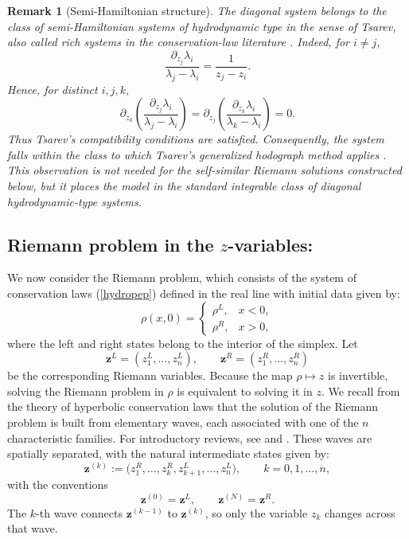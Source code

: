 \documentclass[12pt]{article}
\newtheorem{remark}[theorem]{Remark}
\newcommand{\eref}[1]{(\ref{#1})}
\begin{document}
\begin{remark}[Semi-Hamiltonian structure]
The diagonal system belongs to the class of semi-Hamiltonian systems
of hydrodynamic type in the sense of Tsarev, also called rich systems
in the conservation-law literature \cite{Tsarev,Dubrovin,Serre}. Indeed, for
$i\neq j$,
\[
\frac{\partial_{z_j}\lambda_i}{\lambda_j-\lambda_i}
=
\frac{1}{z_j-z_i}.
\]
Hence, for distinct $i,j,k$,
\[
\partial_{z_k}
\left(
\frac{\partial_{z_j}\lambda_i}{\lambda_j-\lambda_i}
\right)
=
\partial_{z_j}
\left(
\frac{\partial_{z_k}\lambda_i}{\lambda_k-\lambda_i}
\right)
=0.
\]
Thus Tsarev's compatibility conditions are satisfied. Consequently,
the system falls within the class to which Tsarev's generalized
hodograph method applies \cite{Tsarev}. This observation is not needed
for the self-similar Riemann solutions constructed below, but it places
the model in the standard integrable class of diagonal hydrodynamic-type
systems.
\end{remark}

\subsection{Riemann problem in the $z$-variables:}

We now consider the Riemann problem, which consists of the system of conservation laws \eref{hydropep} defined in the real line with initial data given by:
\begin{equation}
\rho(x,0)=
\begin{cases}
\rho^L,& x<0,\\
\rho^R,& x>0,
\end{cases}
\label{eq:Riemann-data-rho}
\end{equation}
where the left and right states belong to the interior of the simplex.
Let
\[
\mathbf{z}^L=(z_1^L,\dots,z_n^L),
\qquad
\mathbf{z}^R=(z_1^R,\dots,z_n^R)
\]
be the corresponding Riemann variables. Because the map $\rho\mapsto z$ is invertible, solving the Riemann problem in $\rho$ is equivalent to solving it in $z$.
We recall from the theory of hyperbolic conservation laws
\cite{Lax73,Lax00,Serr00,Serre} that the solution of the Riemann problem
is built from elementary waves, each associated with one of the $n$
characteristic families. For introductory reviews, see \cite[Ch.~1]{ZahraMulti} and
\cite{zahra2025hydrodynamics}. These waves are spatially separated, with the natural intermediate states given by:
\begin{equation}
\mathbf{z}^{(k)}:=\bigl(z_1^R,\dots,z_k^R,z_{k+1}^L,\dots,z_n^L\bigr),
\qquad k=0,1,\dots,n,
\label{eq:intermediate-states}
\end{equation}
with the conventions
\[
\mathbf{z}^{(0)}=\mathbf{z}^L,
\qquad
\mathbf{z}^{(N)}=\mathbf{z}^R.
\]
The $k$-th wave connects $\mathbf{z}^{(k-1)}$ to $\mathbf{z}^{(k)}$, so only the variable $z_k$ changes across that wave.
\end{document}
